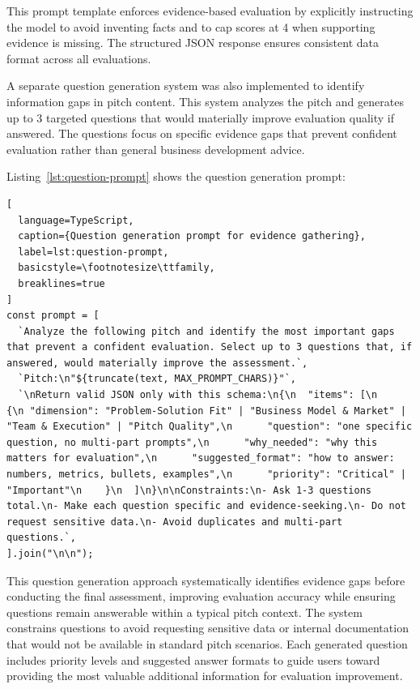 This prompt template enforces evidence-based evaluation by explicitly instructing the model to avoid inventing facts and to cap scores at 4 when supporting evidence is missing. The structured JSON response ensures consistent data format across all evaluations.

A separate question generation system was also implemented to identify information gaps in pitch content. This system analyzes the pitch and generates up to 3 targeted questions that would materially improve evaluation quality if answered. The questions focus on specific evidence gaps that prevent confident evaluation rather than general business development advice.

\clearpage
Listing~\ref{lst:question-prompt} shows the question generation prompt:

\begin{lstlisting}[
  language=TypeScript,
  caption={Question generation prompt for evidence gathering},
  label=lst:question-prompt,
  basicstyle=\footnotesize\ttfamily,
  breaklines=true
]
const prompt = [
  `Analyze the following pitch and identify the most important gaps that prevent a confident evaluation. Select up to 3 questions that, if answered, would materially improve the assessment.`,
  `Pitch:\n"${truncate(text, MAX_PROMPT_CHARS)}"`,
  `\nReturn valid JSON only with this schema:\n{\n  "items": [\n    {\n "dimension": "Problem-Solution Fit" | "Business Model & Market" | "Team & Execution" | "Pitch Quality",\n      "question": "one specific question, no multi-part prompts",\n      "why_needed": "why this matters for evaluation",\n      "suggested_format": "how to answer: numbers, metrics, bullets, examples",\n      "priority": "Critical" | "Important"\n    }\n  ]\n}\n\nConstraints:\n- Ask 1-3 questions total.\n- Make each question specific and evidence-seeking.\n- Do not request sensitive data.\n- Avoid duplicates and multi-part questions.`,
].join("\n\n");
\end{lstlisting}


This question generation approach systematically identifies evidence gaps before conducting the final assessment, improving evaluation accuracy while ensuring questions remain answerable within a typical pitch context. The system constrains questions to avoid requesting sensitive data or internal documentation that would not be available in standard pitch scenarios. Each generated question includes priority levels and suggested answer formats to guide users toward providing the most valuable additional information for evaluation improvement.

